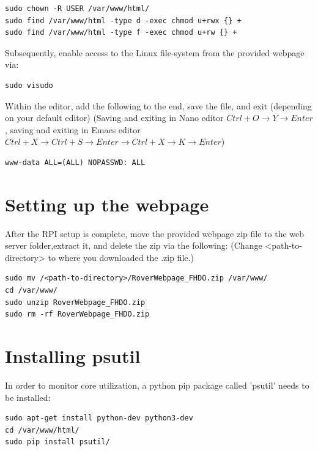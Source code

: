 \begin{lstlisting}
sudo chown -R USER /var/www/html/
sudo find /var/www/html -type d -exec chmod u+rwx {} +
sudo find /var/www/html -type f -exec chmod u+rw {} +
\end{lstlisting}
Subsequently, enable access to the Linux file-system from the provided webpage via:
\begin{lstlisting}
sudo visudo
\end{lstlisting}
Within the editor, add the following to the end, save the file, and exit (depending on your default editor)
(Saving and exiting in Nano editor $Ctrl+O \rightarrow Y \rightarrow Enter$, saving and exiting in Emacs editor $Ctrl + X \rightarrow Ctrl + S \rightarrow Enter \rightarrow Ctrl + X \rightarrow K \rightarrow Enter$) 
\begin{lstlisting}
www-data ALL=(ALL) NOPASSWD: ALL
\end{lstlisting}
\section{Setting up the webpage}
After the RPI setup is complete, move the provided webpage zip file to the web server folder,extract it, and delete the zip via the following: (Change <path-to-directory> to where you downloaded the .zip file.)
\begin{lstlisting}
sudo mv /<path-to-directory>/RoverWebpage_FHDO.zip /var/www/
cd /var/www/ 
sudo unzip RoverWebpage_FHDO.zip
sudo rm -rf RoverWebpage_FHDO.zip
\end{lstlisting}
\section{Installing psutil}
In order to monitor core utilization, a python pip package called 'psutil' needs to be installed:
\begin{lstlisting}
sudo apt-get install python-dev python3-dev
cd /var/www/html/
sudo pip install psutil/
\end{lstlisting}
